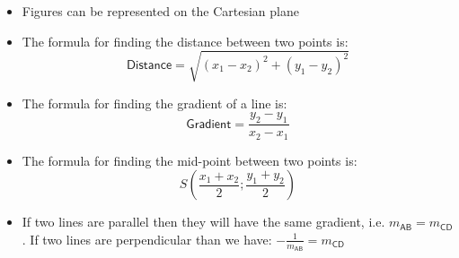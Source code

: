 \summary
\begin{itemize}[noitemsep]
\item Figures can be represented on the Cartesian plane\item The formula for finding the distance between two points is: 
\begin{equation}
\mathsf{Distance}=\sqrt{{({x}_{1}-{x}_{2})}^{2}+{({y}_{1}-{y}_{2})}^{2}}
\end{equation}
\item The formula for finding the gradient of a line is: 
\begin{equation}
\mathsf{Gradient}=\frac{{y}_{2}-{y}_{1}}{{x}_{2}-{x}_{1}}
\end{equation}
\item The formula for finding the mid-point between two points is: 
\begin{equation}
S(\frac{{x}_{1}+{x}_{2}}{2};\frac{{y}_{1}+{y}_{2}}{2})
\end{equation}
\item  If two lines are parallel then they will have the same gradient, i.e. ${m}_{\mathsf{AB}}={m}_{\mathsf{CD}}$. If two lines are perpendicular than we have: $-\frac{1}{{m}_{\mathsf{AB}}}={m}_{\mathsf{CD}}$\end{itemize}
\par 

